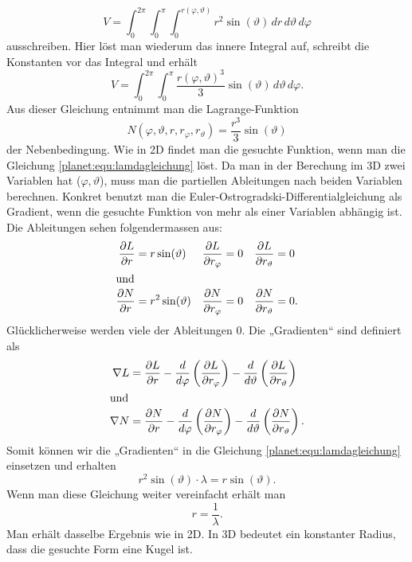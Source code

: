 \begin{equation*}
	V = \int_{0}^{2\pi}\int_{0}^{\pi}\int_{0}^{r(\varphi,\vartheta)} r^2 \sin (\vartheta) \, dr \, d\vartheta \, d\varphi
\end{equation*}
ausschreiben.
Hier löst man wiederum das innere Integral auf, schreibt die Konstanten vor das Integral und erhält
\begin{equation*}
	V = \int_{0}^{2\pi}\int_{0}^{\pi}\frac{r(\varphi,\vartheta)^3}{3} \sin (\vartheta) \, d\vartheta \, d\varphi.
\end{equation*}
Aus dieser Gleichung entnimmt man die Lagrange-Funktion
\begin{equation*}
	N(\varphi,\vartheta ,r,r_\varphi,r_\vartheta) = \frac{r^3}{3} \sin (\vartheta)
\end{equation*}
der Nebenbedingung.
Wie in 2D findet man die gesuchte Funktion, wenn man die Gleichung \eqref{planet:equ:lamdagleichung} löst.
Da man in der Berechung im 3D zwei Variablen hat (\(\varphi,\vartheta\)), muss man die partiellen Ableitungen nach beiden Variablen berechnen.
Konkret benutzt man die Euler-Ostrogradski-Differentialgleichung als Gradient, wenn die gesuchte Funktion von mehr als einer Variablen abhängig ist.
Die Ableitungen sehen folgendermassen aus:
\begin{align*}
	\frac{\partial L}{\partial r} &= r  \sin (\vartheta)& \frac{\partial L}{\partial r_\varphi} &= 0& \frac{\partial L}{\partial r_\vartheta} &= 0 \\
\intertext{und}
	\frac{\partial N}{\partial r} &= r^2\sin (\vartheta)&	\frac{\partial N}{\partial r_\varphi} &= 0&	\frac{\partial N}{\partial r_\vartheta} &= 0.
\end{align*}
Glücklicherweise werden viele der Ableitungen 0.
Die „Gradienten“ sind definiert als
\begin{align*}
	\nabla L &=  \frac{\partial L}{\partial r} -\frac{d}{d\varphi}\left( \frac{\partial L}{\partial r_\varphi} \right) -\frac{d}{d\vartheta}\left( \frac{\partial L}{\partial r_\vartheta} \right) \\
\intertext{und}
	\nabla N &=  \frac{\partial N}{\partial r} -\frac{d}{d\varphi}\left( \frac{\partial N}{\partial r_\varphi} \right) -\frac{d}{d\vartheta}\left( \frac{\partial N}{\partial r_\vartheta} \right).
\end{align*}
Somit können wir die „Gradienten“ in die Gleichung \eqref{planet:equ:lamdagleichung} einsetzen und erhalten
\begin{equation*}
	r^2\sin (\vartheta) \cdot \lambda = r \sin (\vartheta).
\end{equation*}
Wenn man diese Gleichung weiter vereinfacht erhält man
\begin{equation*}
	r = \frac{1}{\lambda}.
\end{equation*}
Man erhält dasselbe Ergebnis wie in 2D.
In 3D bedeutet ein konstanter Radius, dass die gesuchte Form eine Kugel ist.

